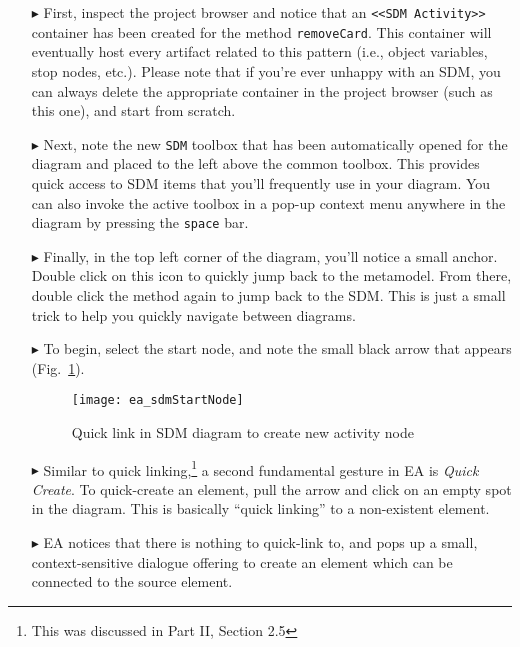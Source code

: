 \begin{itemize}
\item[$\blacktriangleright$] First, inspect the project browser and notice that an \texttt{<<SDM Activity>>} container has been created for the method
\texttt{removeCard}. This container will eventually host every artifact related to this pattern (i.e., object variables, stop nodes, etc.). Please note
that if you're ever unhappy with an SDM, you can always delete the appropriate container in the project browser (such as this one), and start from scratch.

\item[$\blacktriangleright$] Next, note the new \texttt{SDM} toolbox that has been automatically opened for the diagram and placed to the left above
the common toolbox. This provides quick access to SDM items that you'll frequently use in your diagram. You can also invoke the active toolbox in a pop-up
context menu anywhere in the diagram by pressing the \texttt{space} bar.

\item[$\blacktriangleright$] Finally, in the top left corner of the diagram, you'll notice a small anchor. Double click on this icon to quickly jump back to the
metamodel. From there, double click the method again to jump back to the SDM. This is just a small trick to help you quickly navigate between diagrams.

\newpage

\item[$\blacktriangleright$] To begin, select the start node, and note the small black arrow that appears (Fig.~\ref{ea:sdm_quicklink}). 

\begin{figure}[htp]
\begin{center}
  \texttt{[image: ea\_sdmStartNode]}
  \caption{Quick link in SDM diagram to create new activity node}  
  \label{ea:sdm_quicklink}
\end{center}
\end{figure}

\item[$\blacktriangleright$] Similar to quick linking,\footnote{This was discussed in Part II, Section 2.5} a second fundamental gesture in EA is \emph{Quick
Create}.
To quick-create an element, pull the arrow and click on an empty spot in the diagram. This is basically ``quick linking'' to a non-existent element.

\item[$\blacktriangleright$] EA notices that there is nothing to quick-link to, and pops up a small, context-sensitive dialogue offering to create an element
which can be connected to the source element.


\end{itemize}
